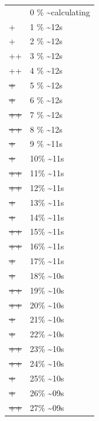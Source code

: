 \documentclass[12pt]{article}
\begin{document}
\begin{center}
\begin{tabular}{ll}
 & 0 \% \textasciitilde{}calculating\\
+ & 1 \% \textasciitilde{}12s\\
+ & 2 \% \textasciitilde{}12s\\
++ & 3 \% \textasciitilde{}12s\\
++ & 4 \% \textasciitilde{}12s\\
\sout{+} & 5 \% \textasciitilde{}12s\\
\sout{+} & 6 \% \textasciitilde{}12s\\
\sout{++} & 7 \% \textasciitilde{}12s\\
\sout{++} & 8 \% \textasciitilde{}12s\\
\sout{\sout{+}} & 9 \% \textasciitilde{}11s\\
\sout{\sout{+}} & 10\% \textasciitilde{}11s\\
\sout{\sout{++}} & 11\% \textasciitilde{}11s\\
\sout{\sout{++}} & 12\% \textasciitilde{}11s\\
\sout{\sout{\sout{+}}} & 13\% \textasciitilde{}11s\\
\sout{\sout{\sout{+}}} & 14\% \textasciitilde{}11s\\
\sout{\sout{\sout{++}}} & 15\% \textasciitilde{}11s\\
\sout{\sout{\sout{++}}} & 16\% \textasciitilde{}11s\\
\sout{\sout{\sout{\sout{+}}}} & 17\% \textasciitilde{}11s\\
\sout{\sout{\sout{\sout{+}}}} & 18\% \textasciitilde{}10s\\
\sout{\sout{\sout{\sout{++}}}} & 19\% \textasciitilde{}10s\\
\sout{\sout{\sout{\sout{++}}}} & 20\% \textasciitilde{}10s\\
\sout{\sout{\sout{\sout{\sout{+}}}}} & 21\% \textasciitilde{}10s\\
\sout{\sout{\sout{\sout{\sout{+}}}}} & 22\% \textasciitilde{}10s\\
\sout{\sout{\sout{\sout{\sout{++}}}}} & 23\% \textasciitilde{}10s\\
\sout{\sout{\sout{\sout{\sout{++}}}}} & 24\% \textasciitilde{}10s\\
\sout{\sout{\sout{\sout{\sout{\sout{+}}}}}} & 25\% \textasciitilde{}10s\\
\sout{\sout{\sout{\sout{\sout{\sout{+}}}}}} & 26\% \textasciitilde{}09s\\
\sout{\sout{\sout{\sout{\sout{\sout{++}}}}}} & 27\% \textasciitilde{}09s\\

\end{tabular}
\end{center}
\end{document}
